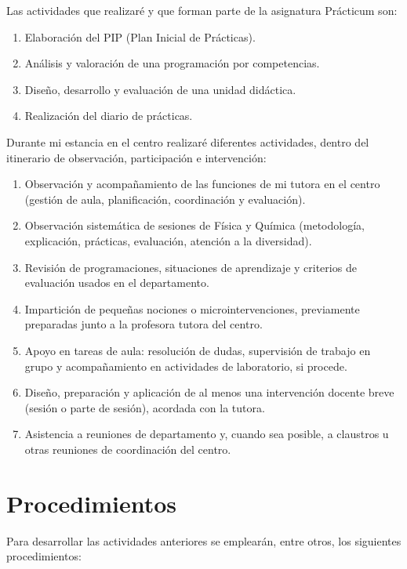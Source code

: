 \documentclass[12pt,a4paper]{article}
\begin{document}
Las actividades que realizaré y que forman parte de la asignatura Prácticum son:

\begin{enumerate}
  \item Elaboración del PIP (Plan Inicial de Prácticas).
  \item Análisis y valoración de una programación por competencias.
  \item Diseño, desarrollo y evaluación de una unidad didáctica.
  \item Realización del diario de prácticas.
\end{enumerate}

Durante mi estancia en el centro realizaré diferentes actividades, dentro del itinerario de observación, participación e intervención:

\begin{enumerate}
  \item Observación y acompañamiento de las funciones de mi tutora en el centro (gestión de aula, planificación, coordinación y evaluación).
  \item Observación sistemática de sesiones de Física y Química (metodología, explicación, prácticas, evaluación, atención a la diversidad).
  \item Revisión de programaciones, situaciones de aprendizaje y criterios de evaluación usados en el departamento.
  \item Impartición de pequeñas nociones o microintervenciones, previamente preparadas junto a la profesora tutora del centro.
  \item Apoyo en tareas de aula: resolución de dudas, supervisión de trabajo en grupo y acompañamiento en actividades de laboratorio, si procede.
  \item Diseño, preparación y aplicación de al menos una intervención docente breve (sesión o parte de sesión), acordada con la tutora.
  \item Asistencia a reuniones de departamento y, cuando sea posible, a claustros u otras reuniones de coordinación del centro.
\end{enumerate}

\section{Procedimientos}\label{subsec:procedimientos}
Para desarrollar las actividades anteriores se emplearán, entre otros, los siguientes procedimientos:
\end{document}
